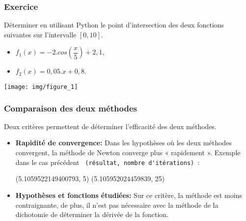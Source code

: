\begin{frame}[fragile]
\frametitle{Exercice}

Déterminer en utilisant Python le point d'intersection des deux fonctions suivantes sur l'intervalle $[0,10]$.

\begin{minipage}{0.45\linewidth}

\begin{itemize}
 \item $f_1(x)=-2.cos(\dfrac{x}{5})+2,1$,
 \item $f_2(x)=0,05.x+0,8$.
\end{itemize}

\texttt{[image: img/figure\_1]}

\end{minipage}\hfill
\begin{minipage}{0.5\linewidth}
\begin{GrayBox}[0.95\textwidth]
\begin{semiverbatim}\small
{}
   \end{semiverbatim}
\end{GrayBox}
\end{minipage}
\end{frame}

\begin{frame}[fragile]
\frametitle{Comparaison des deux méthodes}

Deux critères permettent de déterminer l'efficacité des deux méthodes.

\begin{itemize}
 \item \textbf{Rapidité de convergence:} Dans les hypothèses où les deux méthodes convergent, la méthode de Newton converge plus « rapidement ». Exemple dans le cas précédent \verb? (résultat, nombre d'itérations) ?:
 \begin{GrayBox}[0.4\textwidth]
\begin{verbatimtab}[3]
(5.1059522149400793, 5)
(5.105952024459839, 25)
\end{verbatimtab}
\end{GrayBox}
 \item \textbf{Hypothèses et fonctions étudiées:} Sur ce critère, la méthode est moins contraignante, de plus, il n'est pas nécessaire avec la méthode de la dichotomie de déterminer la dérivée de la fonction.
\end{itemize}

\end{frame}


